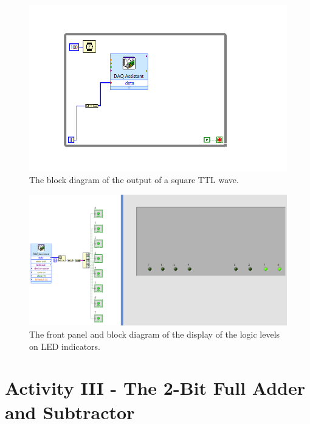 \documentclass[11pt]{article}
\begin{document}
\begin{figure}[H]
 \begin{center}
  \includegraphics[width=\linewidth/2]{act2_3b}
  \caption{The block diagram of the output of a square TTL wave.}
  \label{fig:act2_3b}
 \end{center}
\end{figure}

\begin{figure}[H]
 \begin{center}
  \includegraphics[width=\linewidth/2]{act2_4}
  \caption{The front panel and block diagram of the display of the logic levels on LED indicators.}
  \label{fig:act2_4}
 \end{center}
\end{figure}


\section{Activity III - The 2-Bit Full Adder and Subtractor}
\end{document}
